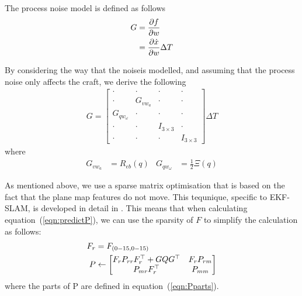\documentclass[]{article}
\begin{document}
{The process noise model is defined as follows
\begin{align}
	G &= \frac{\partial f}{\partial w} \notag \\
	&=
	\frac{\partial \dot{x}}{\partial w} \Delta T
\end{align}

By considering the way that the noiseis modelled, and assuming that the process noise only affects the craft, we derive the following
\begin{align}
	G = \left[
	\begin{matrix}
		\cdot 			& \cdot 	& \cdot 		& \cdot \\
		\cdot 			& G_{vw_a} 	& \cdot 		& \cdot \\
		G_{qw_\omega}	& \cdot 	& \cdot 		& \cdot \\
		\cdot 			& \cdot 	& I_{3\times3}	& \cdot \\
		\cdot 			& \cdot 	& \cdot 		& I_{3\times3}
	\end{matrix}
	\right]
	\Delta T
\end{align}
where
\begin{align}
	G_{vw_a} &= R_{eb}(q)
&
	G_{qw_\omega} &= \frac{1}{2} \Xi(q)
\end{align}

As mentioned above, we use a sparse matrix optimisation that is based on the fact that the plane map features do not move. This tequnique, specific to EKF-SLAM, is developed in detail in \cite{Sola2013}.
This means that when calculating equation~(\ref{eqn:predictP}), we can use the sparsity of $F$ to simplify the calculation as follows:
\begin{align}
	F_r &= F_{(0-15,0-15)} \notag \\
	P &\leftarrow
	\left[
	\begin{matrix}
		F_r P_{rr} F_r^\top + GQG^\top 	& F_r P_{rm} \\
		P_{mr} F_r^\top 				& P_{mm}
	\end{matrix}
	\right]
\end{align}
where the parts of P are defined in equation~(\ref{eqn:Pparts}).

}
\end{document}
